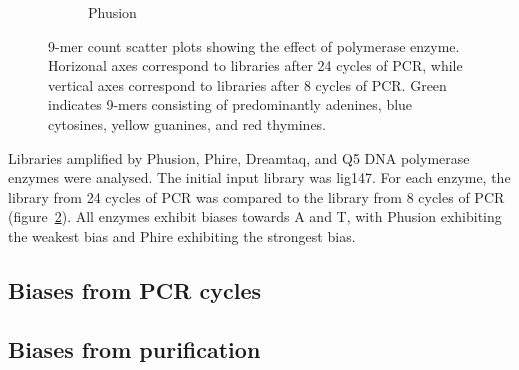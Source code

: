 \documentclass[parskip=full, numbers=noenddot]{scrreprt}
\begin{document}
\begin{figure}[htpb]
\begin{subfigure}[htpb]{0.4\textwidth}
    \caption{Phusion}
    \label{fig:kmer_enz_phusion}
  \end{subfigure}
  \caption{9-mer count scatter plots showing the effect of polymerase enzyme.  Horizonal axes correspond to libraries after 24 cycles of PCR, while vertical axes correspond to libraries after 8 cycles of PCR.  Green indicates 9-mers consisting of predominantly adenines, blue cytosines, yellow guanines, and red thymines.}
  \label{fig:kmer_enz}
\end{figure}

Libraries amplified by Phusion, Phire, Dreamtaq, and Q5 DNA polymerase enzymes were analysed.  The initial input library was lig147.  For each enzyme, the library from 24 cycles of PCR was compared to the library from 8 cycles of PCR (figure~\ref{fig:kmer_enz}). %
All enzymes exhibit biases towards A and T, with Phusion exhibiting the weakest bias and Phire exhibiting the strongest bias.

\subsection{Biases from PCR cycles}
\label{ssec:pcrbias_result_pcr}



\subsection{Biases from purification}
\label{ssec:pcrbias_result_pur}
\end{document}
